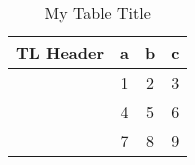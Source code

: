 \begin{table}
\centering
\begin{threeparttable}
\caption{My Table Title}
\begin{tabular}{lccc}
\toprule
TL Header & a & b & c\\
\midrule
 & 1 & 2 & 3 \\
 & 4 & 5 & 6 \\
 & 7 & 8 & 9 \\
\bottomrule

\end{tabular}
\end{threeparttable}
\end{table}